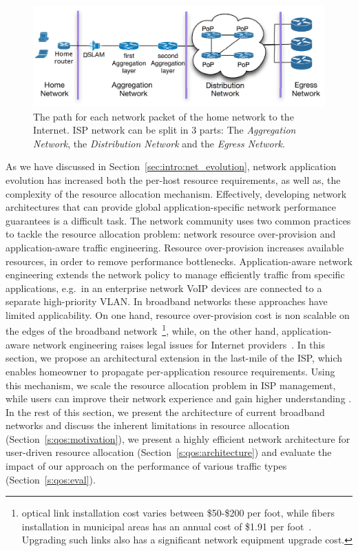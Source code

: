\begin{figure}
  \centering
  \includegraphics[width=0.95\columnwidth]{isp_plan}
  \caption{\label{fig:isp_plan} The path for each network packet of 
    the home network to the Internet. ISP network can be split in 3 parts:
  The {\it Aggregation Network}, the {\it Distribution Network}\/ and the {\it
    Egress Network}.}
\end{figure}

As we have discussed in Section~\ref{sec:intro:net_evolution}, network
application evolution has increased both the per-host resource requirements, as
well as, the complexity of the resource allocation mechanism. Effectively,
developing network architectures that can provide global application-specific
network performance guarantees is a difficult task. The network community uses
two common practices to tackle the resource allocation problem: network resource
over-provision and application-aware traffic engineering.  Resource
over-provision increases available resources, in order to remove performance
bottlenecks.  Application-aware network engineering extends the network policy
to  manage efficiently traffic from specific applications, e.g.~in an enterprise
network VoIP devices are connected to a separate high-priority VLAN\@. In
broadband networks these approaches have limited applicability. On one hand,
resource over-provision cost is non scalable on the edges of the broadband
network~\footnote{optical link installation cost varies between \$50-\$200 per
  foot, while fibers installation in municipal areas has an annual cost of
  \$1.91 per foot~\cite{backhaul-cost}. Upgrading such links also has a
  significant network equipment upgrade cost.}, while, on the other hand,
application-aware network engineering raises legal issues for Internet
providers~\cite{hahn06}. In this section, we propose an architectural extension
in the last-mile of the ISP, which enables homeowner to propagate
per-application resource requirements. Using this mechanism, we scale the
resource allocation problem in ISP management, while users can improve their
network experience and gain higher understanding .
In the rest of this section,  we present the architecture of current broadband
networks and discuss the inherent limitations in resource allocation
(Section~\ref{s:qos:motivation}), we present a highly efficient network
architecture for user-driven resource allocation
(Section~\ref{s:qos:architecture}) and evaluate the impact of our approach on
the performance of various traffic types (Section~\ref{s:qos:eval}).

